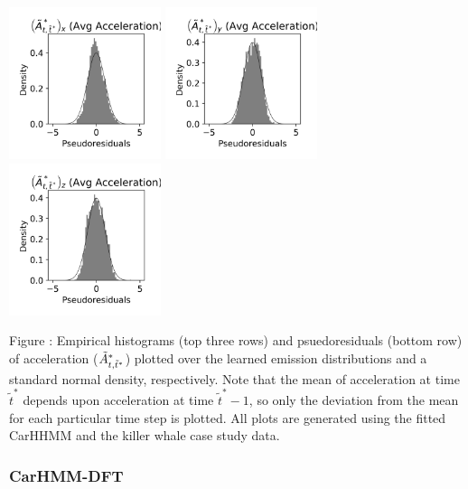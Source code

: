 \documentclass{article}
\begin{document}
\begin{center}
        \includegraphics[width=1.75in]{../Plots/CarHHMM1_psedoresids_Ax.png}
        \includegraphics[width=1.75in]{../Plots/CarHHMM1_psedoresids_Ay.png}
        \includegraphics[width=1.75in]{../Plots/CarHHMM1_psedoresids_Az.png}
        \end{center}
        
        \noindent Figure : Empirical histograms (top three rows) and psuedoresiduals (bottom row) of acceleration ($\tilde{A}^*_{t,\tilde t^*}$) plotted over the learned emission distributions and a standard normal density, respectively. Note that the mean of acceleration at time $\tilde t^*$ depends upon acceleration at time $\tilde t^*-1$, so only the deviation from the mean for each particular time step is plotted. All plots are generated using the fitted CarHHMM and the killer whale case study data.
        \addtocounter{fignum}{1}
        
        \newpage
        
        \subsubsection{CarHMM-DFT}
        
\end{document}
